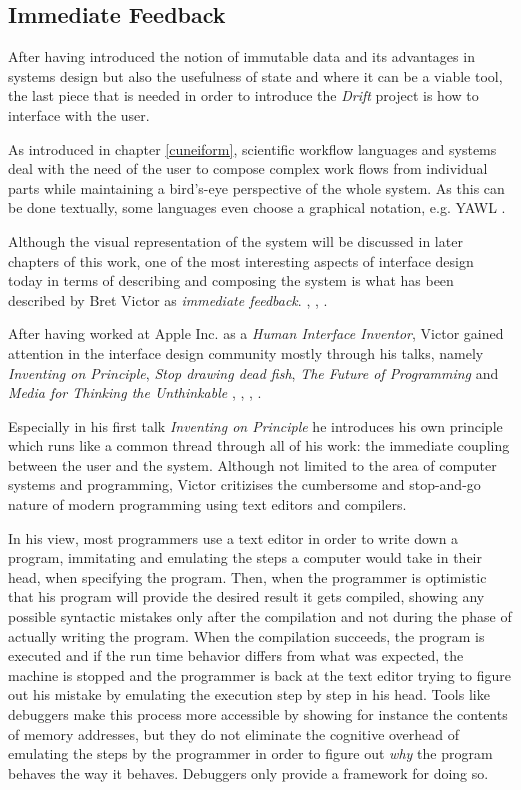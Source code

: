 \subsection{Immediate Feedback}
\label{bretvictor}

After having introduced the notion of immutable data and its advantages
in systems design but also the usefulness of state and
where it can be a viable tool, the last piece that is needed in order
to introduce the \textit{Drift} project is how to interface with
the user.

As introduced in chapter \ref{cuneiform}, scientific workflow
languages and systems deal with the need of the user to compose
complex work flows from individual parts while maintaining a
bird's-eye perspective of the whole system. As this can be
done textually, some languages even choose a graphical notation,
e.g. YAWL \cite{yawl}.

Although the visual representation of
the system will be discussed in later chapters of this work,
one of the most interesting aspects of interface design today
in terms of describing and composing the system is what has been
described by Bret Victor  as \textit{immediate feedback}.
\cite{bretvictor}, \cite{bretvictorwiki}, \cite{bretvictortalk1}.

After having worked at Apple Inc. as a \textit{Human Interface Inventor},
Victor gained attention in the interface design community mostly
through his talks, namely \textit{Inventing on Principle},
\textit{Stop drawing dead fish}, \textit{The Future of Programming}
and \textit{Media for Thinking the Unthinkable}
\cite{bretvictortalk1}, \cite{bretvictortalk2}, \cite{bretvictortalk3},
\cite{bretvictortalk4}.

Especially in his first talk \textit{Inventing on Principle} he
introduces his own principle which runs like a common thread through
all of his work: the immediate coupling between the user
and the system.
Although not limited to the area of computer
systems and programming, Victor critizises the cumbersome and
stop-and-go nature of modern programming using text editors and
compilers.

In his view, most programmers use a text editor in order
to write down a program, immitating and emulating the steps a computer
would take in their head, when specifying the program. Then,
when the programmer is optimistic that his program will provide the
desired result it gets compiled, showing any possible syntactic
mistakes only after the compilation and not during the phase of
actually writing the program.
When the compilation succeeds, the program is executed and if
the run time behavior differs from what was expected, the machine
is stopped and the programmer is back at the text editor trying to
figure out his mistake by emulating the execution step by step in
his head. Tools like debuggers make this process more accessible
by showing for instance the contents of memory addresses, but they
do not eliminate the cognitive overhead of emulating the steps
by the programmer in order to figure out \textit{why} the program
behaves the way it behaves. Debuggers only provide a framework for
doing so.

